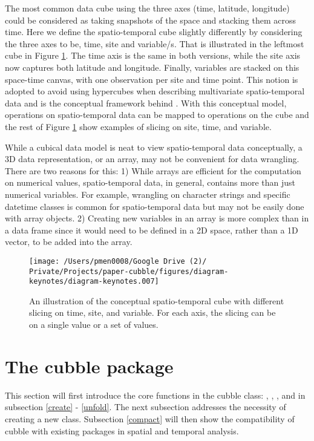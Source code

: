 \documentclass{article}
\begin{document}
The most common data cube using the three axes (time, latitude, longitude) could be considered as taking snapshots of the space and stacking them across time. Here we define the spatio-temporal cube slightly differently by considering the three axes to be, time, site and variable/s. That is illustrated in the leftmost cube in Figure \ref{fig:cube-def}. The time axis is the same in both versions, while the site axis now captures both latitude and longitude. Finally, variables are stacked on this space-time canvas, with one observation per site and time point. This notion is adopted to avoid using hypercubes when describing multivariate spatio-temporal data and is the conceptual framework behind . With this conceptual model, operations on spatio-temporal data can be mapped to operations on the cube and the rest of Figure \ref{fig:cube-def} show examples of slicing on site, time, and variable.

While a cubical data model is neat to view spatio-temporal data conceptually, a 3D data representation, or an array, may not be convenient for data wrangling. There are two reasons for this: 1) While arrays are efficient for the computation on numerical values, spatio-temporal data, in general, contains more than just numerical variables. For example, wrangling on character strings and specific datetime classes is common for spatio-temporal data but may not be easily done with array objects. 2) Creating new variables in an array is more complex than in a data frame since it would need to be defined in a 2D space, rather than a 1D vector, to be added into the array.

\begin{figure}

{\centering \texttt{[image: /Users/pmen0008/Google Drive (2)/ Private/Projects/paper-cubble/figures/diagram-keynotes/diagram-keynotes.007]} 

}

\caption{An illustration of the conceptual spatio-temporal cube with different slicing on time, site, and variable. For each axis, the slicing can be on a single value or a set of values.}\label{fig:cube-def}
\end{figure}

\hypertarget{cubble}{%
\section{The cubble package}\label{cubble}}

This section will first introduce the core functions in the cubble class: , , , and  in subsection \ref{create} - \ref{unfold}. The next subsection addresses the necessity of creating a new class. Subsection \ref{compact} will then show the compatibility of cubble with existing packages in spatial and temporal analysis.
\end{document}
